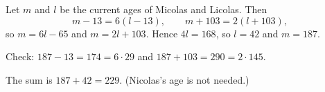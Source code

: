 Let $m$ and $l$ be the current ages of Micolas and Licolas. Then
\[m-13=6(l-13),\qquad m+103=2(l+103),\]
so $m=6l-65$ and $m=2l+103$. Hence $4l=168$, so $l=42$ and $m=187$.

Check: $187-13=174=6\cdot29$ and $187+103=290=2\cdot145$.

The sum is $187+42=\boxed{229}$. (Nicolas's age is not needed.)

